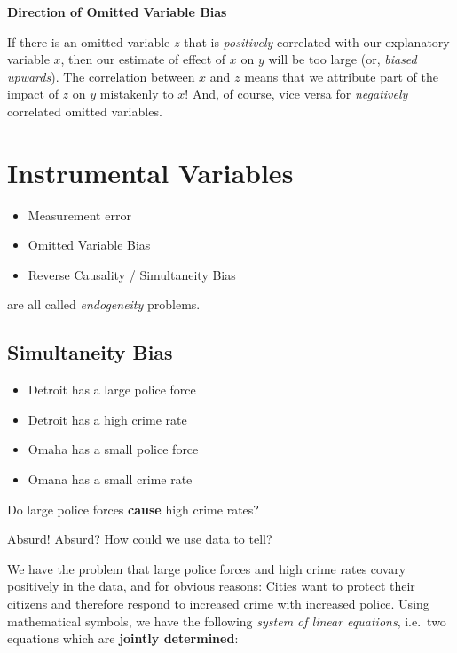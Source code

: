 \documentclass[]{book}
\providecommand{\tightlist}{%
  \setlength{\itemsep}{0pt}\setlength{\parskip}{0pt}}
\newenvironment{note}{\begin{tcolorbox}[colback=blue!5!white,colframe=blue!75!black]}{\end{tcolorbox}}
\begin{document}
\begin{note}
\textbf{Direction of Omitted Variable Bias}

If there is an omitted variable \(z\) that is \emph{positively}
correlated with our explanatory variable \(x\), then our estimate of
effect of \(x\) on \(y\) will be too large (or, \emph{biased upwards}).
The correlation between \(x\) and \(z\) means that we attribute part of
the impact of \(z\) on \(y\) mistakenly to \(x\)! And, of course, vice
versa for \emph{negatively} correlated omitted variables.
\end{note}

\chapter{Instrumental Variables}\label{IV}

\begin{itemize}
\tightlist
\item
  Measurement error
\item
  Omitted Variable Bias
\item
  Reverse Causality / Simultaneity Bias
\end{itemize}

are all called \emph{endogeneity} problems.

\section{Simultaneity Bias}\label{simultaneity-bias}

\begin{itemize}
\tightlist
\item
  Detroit has a large police force
\item
  Detroit has a high crime rate
\item
  Omaha has a small police force
\item
  Omana has a small crime rate
\end{itemize}

Do large police forces \textbf{cause} high crime rates?

Absurd! Absurd? How could we use data to tell?

We have the problem that large police forces and high crime rates covary
positively in the data, and for obvious reasons: Cities want to protect
their citizens and therefore respond to increased crime with increased
police. Using mathematical symbols, we have the following \emph{system
of linear equations}, i.e.~two equations which are \textbf{jointly
determined}:
\end{document}
